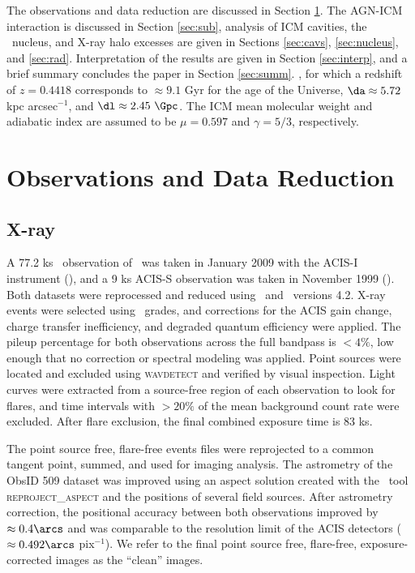 \documentclass[useAMS,usenatbib]{mn2e}
\begin{document}
The observations and data reduction are discussed in Section
\ref{sec:obs}. The AGN-ICM interaction is discussed in Section
\ref{sec:sub}, analysis of ICM cavities, the \irs\ nucleus, and X-ray
halo excesses are given in Sections \ref{sec:cavs}, \ref{sec:nucleus},
and \ref{sec:rad}. Interpretation of the results are given in Section
\ref{sec:interp}, and a brief summary concludes the paper in Section
\ref{sec:summ}. \LCDM, for which a redshift of $z = 0.4418$
corresponds to $\approx 9.1$ Gyr for the age of the Universe, $\da
\approx 5.72$ kpc arcsec$^{-1}$, and $\dl \approx 2.45~\Gpc$. The ICM
mean molecular weight and adiabatic index are assumed to be $\mu =
0.597$ and $\gamma = 5/3$, respectively.

\section{Observations and Data Reduction}
\label{sec:obs}

\subsection{X-ray}
\label{sec:xray}

A 77.2 ks \cxo\ observation of \irs\ was taken in January 2009 with
the ACIS-I instrument (),
and a 9 ks ACIS-S observation was taken in November 1999 (). Both datasets were reprocessed
and reduced using \ciao\ and \caldb\ versions 4.2. X-ray events were
selected using \asca\ grades, and corrections for the ACIS gain
change, charge transfer inefficiency, and degraded quantum efficiency
were applied. The pileup percentage for both observations across the
full bandpass is $< 4\%$, low enough that no correction or spectral
modeling was applied. Point sources were located and excluded using
{\textsc{wavdetect}} and verified by visual inspection. Light curves
were extracted from a source-free region of each observation to look
for flares, and time intervals with $> 20\%$ of the mean background
count rate were excluded. After flare exclusion, the final combined
exposure time is 83 ks.

The point source free, flare-free events files were reprojected to a
common tangent point, summed, and used for imaging analysis. The
astrometry of the ObsID 509 dataset was improved using an aspect
solution created with the \ciao\ tool {\textsc{reproject\_aspect}} and
the positions of several field sources. After astrometry correction,
the positional accuracy between both observations improved by $\approx
0.4\arcs$ and was comparable to the resolution limit of the ACIS
detectors ($\approx 0.492\arcs$ pix$^{-1}$). We refer to the final
point source free, flare-free, exposure-corrected images as the
``clean'' images.
\end{document}
